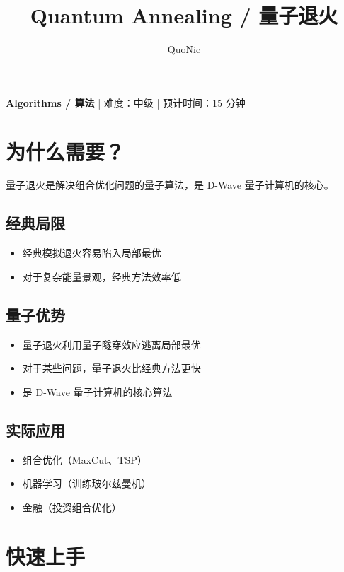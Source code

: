 \documentclass[12pt,a4paper]{article}
\title{Quantum Annealing / 量子退火}
\author{QuoNic}
\date{}
\begin{document}
\maketitle

\begin{center}
\textbf{Algorithms / 算法} | 难度：中级 | 预计时间：15 分钟
\end{center}

\tableofcontents
\newpage

\section{为什么需要？}

量子退火是解决组合优化问题的量子算法，是 D-Wave 量子计算机的核心。

\subsection{经典局限}
\begin{itemize}
  \item 经典模拟退火容易陷入局部最优
  \item 对于复杂能量景观，经典方法效率低
\end{itemize}

\subsection{量子优势}
\begin{itemize}
  \item 量子退火利用量子隧穿效应逃离局部最优
  \item 对于某些问题，量子退火比经典方法更快
  \item 是 D-Wave 量子计算机的核心算法
\end{itemize}

\subsection{实际应用}
\begin{itemize}
  \item 组合优化（MaxCut、TSP）
  \item 机器学习（训练玻尔兹曼机）
  \item 金融（投资组合优化）
\end{itemize}

\section{快速上手}
\end{document}
